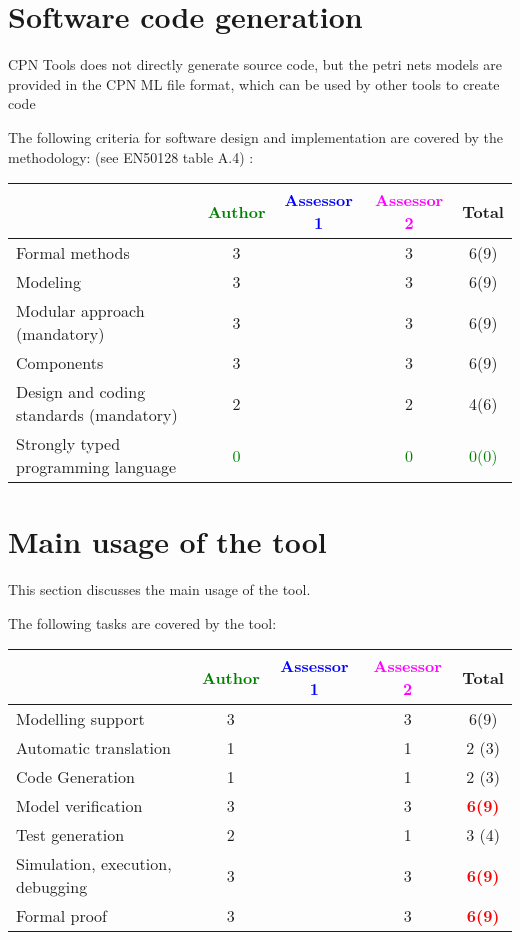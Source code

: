 \section{Software code generation}

CPN Tools does not directly generate source code, but the petri nets models are provided in the CPN ML file format, which can be used by other tools to create code

The following criteria for software design and implementation are covered by the methodology:
(see EN50128 table A.4) :

\begin{tabular}{|l | c | c | c | c|}
\hline
& \textcolor{green}{Author} & \textcolor{blue}{Assessor 1} & \textcolor{magenta}{Assessor 2} & Total \\
\hline
Formal methods  & 3     & & 3     &  6(9) \\
\hline 
Modeling  & 3     & & 3     &  6(9) \\
\hline
Modular approach (mandatory) & 3     & & 3     &  6(9) \\
\hline
Components & 3     & & 3     &  6(9) \\
\hline
Design and coding standards (mandatory) & 2     & & 2     &  4(6) \\
\hline
Strongly typed programming language & \textcolor{green}{0} & & \textcolor{green}{0} & \textcolor{green}{0(0)}  \\
\hline

\end{tabular}



\section{Main usage of the tool}
\label{main_usage}

This section discusses the main usage of the tool.

The following tasks are covered by the tool:


\begin{tabular}{|l | c | c | c | c|}
\hline
& \textcolor{green}{Author} & \textcolor{blue}{Assessor 1} & \textcolor{magenta}{Assessor 2} & Total \\
\hline 
Modelling support & 3     & & 3     &  6(9) \\
\hline
Automatic translation  & 1     & & 1     & 2 (3) \\
\hline
Code Generation  & 1     & & 1     & 2 (3) \\
\hline
Model verification & 3     & & 3     & \textcolor{red}{\textbf{6(9)}}  \\
\hline
Test generation & 2     & & 1     & 3 (4) \\
\hline
Simulation, execution, debugging & 3     & & 3     & \textcolor{red}{\textbf{6(9)}}  \\
\hline
Formal proof & 3     & & 3     & \textcolor{red}{\textbf{6(9)}}  \\
\hline
\end{tabular}

